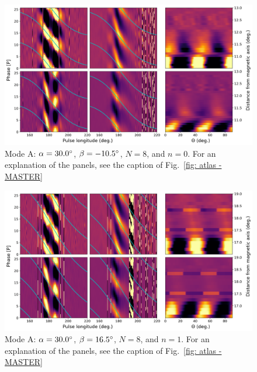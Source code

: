\begin{figure}
	\begin{center}
		\includegraphics[width=\atlasHeightFrac\textwidth]{Figures/B0031/atlas/A_517030008000_plots}
		\caption[Atlas results: Mode A -- $\alpha=30.0\degr$, $\beta=-10.5\degr$, $N=8$, $n=0$]{Mode A: $\alpha=30.0\degr$, $\beta=-10.5\degr$, $N=8$, and $n=0$. For an explanation of the panels, see the caption of Fig.~\ref{fig: atlas - MASTER} }
		\label{fig: atlas - A_517030008000}
	\end{center}
\end{figure}

\begin{figure}
	\begin{center}
		\includegraphics[width=\atlasHeightFrac\textwidth]{Figures/B0031/atlas/A_517030008001_plots}
		\caption[Atlas results: Mode A -- $\alpha=30.0\degr$, $\beta=16.5\degr$, $N=8$, $n=1$]{Mode A: $\alpha=30.0\degr$, $\beta=16.5\degr$, $N=8$, and $n=1$. For an explanation of the panels, see the caption of Fig.~\ref{fig: atlas - MASTER} }
		\label{fig: atlas - A_517030008001}
	\end{center}
\end{figure}

